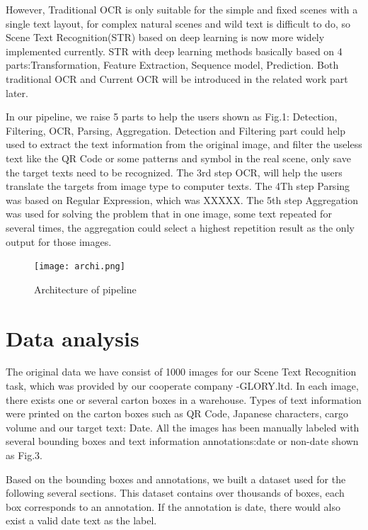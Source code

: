 \documentclass{article}
\begin{document}
However, Traditional OCR is only suitable for the simple and fixed scenes with a single text layout, for complex natural scenes and wild text is difficult to do, so Scene Text Recognition(STR) based on deep learning is now more widely implemented currently.
STR with deep learning methods basically based on 4 parts:Transformation, Feature Extraction, Sequence model, Prediction. Both traditional OCR and Current OCR will be introduced in the related work part later.\par
In our pipeline, we raise 5 parts to help the users shown as Fig.1: Detection, Filtering, OCR, Parsing, Aggregation. Detection and Filtering part could help used to extract the text information from the original image, and filter the useless text like the QR Code or some patterns and symbol in the real scene, only save the target texts need to be recognized. The 3rd step OCR, will help the users translate the targets from image type to computer texts. The 4Th step Parsing was based on Regular Expression, which was XXXXX. The 5th step Aggregation was used for solving the problem that in one image, some text repeated for several times, the aggregation could select a highest repetition result as the only output for those images.

\begin{figure}[ht] \centering    
	\label{architecture}     
	\texttt{[image: archi.png]}  
   
	\caption{Architecture of pipeline}
\end{figure}

\section{Data analysis}

The original data we have consist of 1000 images for our Scene Text Recognition task, which was provided by our cooperate company -GLORY.ltd. In each image, there exists one or several carton boxes in a warehouse. Types of text information were printed on the carton boxes such as QR Code, Japanese characters, cargo volume and our target text: Date.
All the images has been manually labeled with several bounding boxes and text information annotations:date or non-date shown as Fig.3.

Based on the bounding boxes and annotations, we built a dataset used for the following several sections. This dataset contains over thousands of boxes, each box corresponds to an annotation. If the annotation is date, there would also exist a valid date text as the label.
\end{document}
